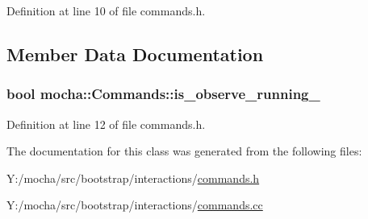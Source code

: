 Definition at line 10 of file commands.h.



\subsection{Member Data Documentation}
\hypertarget{classmocha_1_1_commands_a50baa86fd453e3e727829f8e10c1e05b}{
\subsubsection[{is\_\-observe\_\-running\_\-}]{\setlength{\rightskip}{0pt plus 5cm}bool {\bf mocha::Commands::is\_\-observe\_\-running\_\-}}}
\label{classmocha_1_1_commands_a50baa86fd453e3e727829f8e10c1e05b}


Definition at line 12 of file commands.h.



The documentation for this class was generated from the following files:\begin{DoxyCompactItemize}
\item 
Y:/mocha/src/bootstrap/interactions/\hyperlink{commands_8h}{commands.h}\item 
Y:/mocha/src/bootstrap/interactions/\hyperlink{commands_8cc}{commands.cc}\end{DoxyCompactItemize}
